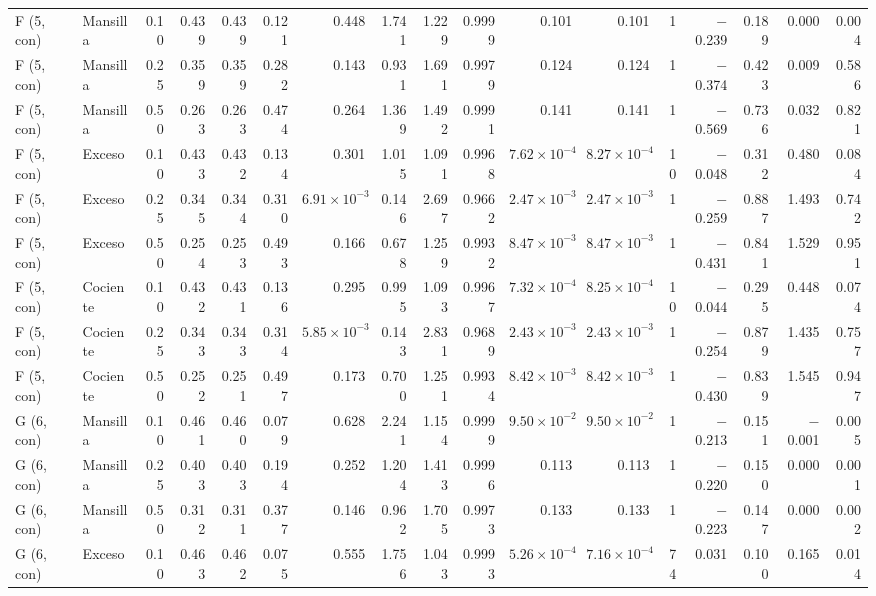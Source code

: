 \documentclass[11pt,letterpaper]{article}
\begin{document}
\begin{landscape}
\begin{scriptsize}
\begin{longtable}{llrrrrrrrrrrrrrrr}
F (5, con) & Mansilla & 0.10 & 0.439 & 0.439 & 0.121 & 0.448 & 1.741 & 1.229 & 0.9999 & 0.101 & 0.101 & 1 & $-$0.239 & 0.189 & 0.000 & 0.004 \\
F (5, con) & Mansilla & 0.25 & 0.359 & 0.359 & 0.282 & 0.143 & 0.931 & 1.691 & 0.9979 & 0.124 & 0.124 & 1 & $-$0.374 & 0.423 & 0.009 & 0.586 \\
F (5, con) & Mansilla & 0.50 & 0.263 & 0.263 & 0.474 & 0.264 & 1.369 & 1.492 & 0.9991 & 0.141 & 0.141 & 1 & $-$0.569 & 0.736 & 0.032 & 0.821 \\
F (5, con) & Exceso & 0.10 & 0.433 & 0.432 & 0.134 & 0.301 & 1.015 & 1.091 & 0.9968 & $7.62\times10^{-4}$ & $8.27\times10^{-4}$ & 10 & $-$0.048 & 0.312 & 0.480 & 0.084 \\
F (5, con) & Exceso & 0.25 & 0.345 & 0.344 & 0.310 & $6.91\times10^{-3}$ & 0.146 & 2.697 & 0.9662 & $2.47\times10^{-3}$ & $2.47\times10^{-3}$ & 1 & $-$0.259 & 0.887 & 1.493 & 0.742 \\
F (5, con) & Exceso & 0.50 & 0.254 & 0.253 & 0.493 & 0.166 & 0.678 & 1.259 & 0.9932 & $8.47\times10^{-3}$ & $8.47\times10^{-3}$ & 1 & $-$0.431 & 0.841 & 1.529 & 0.951 \\
F (5, con) & Cociente & 0.10 & 0.432 & 0.431 & 0.136 & 0.295 & 0.995 & 1.093 & 0.9967 & $7.32\times10^{-4}$ & $8.25\times10^{-4}$ & 10 & $-$0.044 & 0.295 & 0.448 & 0.074 \\
F (5, con) & Cociente & 0.25 & 0.343 & 0.343 & 0.314 & $5.85\times10^{-3}$ & 0.143 & 2.831 & 0.9689 & $2.43\times10^{-3}$ & $2.43\times10^{-3}$ & 1 & $-$0.254 & 0.879 & 1.435 & 0.757 \\
F (5, con) & Cociente & 0.50 & 0.252 & 0.251 & 0.497 & 0.173 & 0.700 & 1.251 & 0.9934 & $8.42\times10^{-3}$ & $8.42\times10^{-3}$ & 1 & $-$0.430 & 0.839 & 1.545 & 0.947 \\
G (6, con) & Mansilla & 0.10 & 0.461 & 0.460 & 0.079 & 0.628 & 2.241 & 1.154 & 0.9999 & $9.50\times10^{-2}$ & $9.50\times10^{-2}$ & 1 & $-$0.213 & 0.151 & $-$0.001 & 0.005 \\
G (6, con) & Mansilla & 0.25 & 0.403 & 0.403 & 0.194 & 0.252 & 1.204 & 1.413 & 0.9996 & 0.113 & 0.113 & 1 & $-$0.220 & 0.150 & 0.000 & 0.001 \\
G (6, con) & Mansilla & 0.50 & 0.312 & 0.311 & 0.377 & 0.146 & 0.962 & 1.705 & 0.9973 & 0.133 & 0.133 & 1 & $-$0.223 & 0.147 & 0.000 & 0.002 \\
G (6, con) & Exceso & 0.10 & 0.463 & 0.462 & 0.075 & 0.555 & 1.756 & 1.043 & 0.9993 & $5.26\times10^{-4}$ & $7.16\times10^{-4}$ & 74 & 0.031 & 0.100 & 0.165 & 0.014 \\

\end{longtable}
\end{scriptsize}
\end{landscape}
\end{document}
